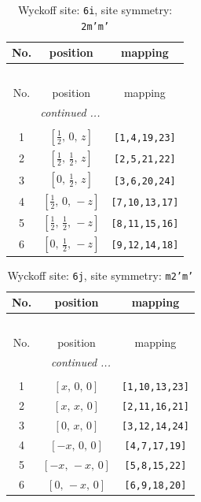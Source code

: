 \documentclass[fleqn,8pt]{jsarticle}
\begin{document}
\renewcommand{\arraystretch}{1.2}
\begin{longtable}{ccc}
\caption{Wyckoff site: {\tt 6i}, site symmetry: {\tt 2m'm'}}
 \\
 \hline \hline
No. & position & mapping \\ \hline \endfirsthead

\multicolumn{2}{l}{\tablename\ \thetable{}} \\
 \hline \hline
No. & position & mapping \\ \hline \endhead

 \hline \hline
\multicolumn{2}{r}{\footnotesize\it continued ...} \\ \endfoot

 \hline \hline
\multicolumn{2}{r}{} \\ \endlastfoot

1 & $\left[ \frac{1}{2},\, 0,\, z \right]$ & {\tt [1,4,19,23]} \\ \hline
2 & $\left[ \frac{1}{2},\, \frac{1}{2},\, z \right]$ & {\tt [2,5,21,22]} \\ \hline
3 & $\left[ 0,\, \frac{1}{2},\, z \right]$ & {\tt [3,6,20,24]} \\ \hline
4 & $\left[ \frac{1}{2},\, 0,\, - z \right]$ & {\tt [7,10,13,17]} \\ \hline
5 & $\left[ \frac{1}{2},\, \frac{1}{2},\, - z \right]$ & {\tt [8,11,15,16]} \\ \hline
6 & $\left[ 0,\, \frac{1}{2},\, - z \right]$ & {\tt [9,12,14,18]} \\
\end{longtable}
\renewcommand{\arraystretch}{1.2}
\begin{longtable}{ccc}
\caption{Wyckoff site: {\tt 6j}, site symmetry: {\tt m2'm'}}
 \\
 \hline \hline
No. & position & mapping \\ \hline \endfirsthead

\multicolumn{2}{l}{\tablename\ \thetable{}} \\
 \hline \hline
No. & position & mapping \\ \hline \endhead

 \hline \hline
\multicolumn{2}{r}{\footnotesize\it continued ...} \\ \endfoot

 \hline \hline
\multicolumn{2}{r}{} \\ \endlastfoot

1 & $\left[ x,\, 0,\, 0 \right]$ & {\tt [1,10,13,23]} \\ \hline
2 & $\left[ x,\, x,\, 0 \right]$ & {\tt [2,11,16,21]} \\ \hline
3 & $\left[ 0,\, x,\, 0 \right]$ & {\tt [3,12,14,24]} \\ \hline
4 & $\left[ - x,\, 0,\, 0 \right]$ & {\tt [4,7,17,19]} \\ \hline
5 & $\left[ - x,\, - x,\, 0 \right]$ & {\tt [5,8,15,22]} \\ \hline
6 & $\left[ 0,\, - x,\, 0 \right]$ & {\tt [6,9,18,20]} \\
\end{longtable}
\end{document}
